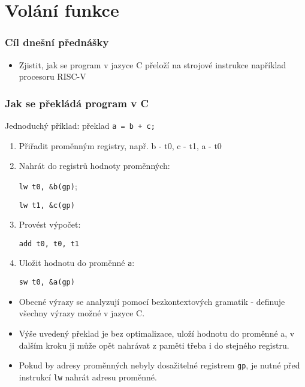 \documentclass{beamer}
\subtitle{Lekce 10. Překlad jazyka C}
\author{Pavel Píša \phantom{xxxxxxxxx} Petr Štěpán \\ \small\texttt{pisa@fel.cvut.cz}\phantom{xxxx}\small\texttt{stepan@fel.cvut.cz}}
\begin{document}
\maketitle

\section{Volání funkce}

\begin{frame}
\frametitle{Cíl dnešní přednášky}

\begin{itemize}
 \item Zjistit, jak se program v jazyce C přeloží na strojové instrukce například procesoru RISC-V
\end{itemize}
\end{frame}


\begin{frame}
\frametitle{Jak se překládá program v C}

Jednoduchý příklad: překlad \texttt{a = b + c;}
\begin{enumerate}
 \item Přiřadit proměnným registry, např. b - t0, c - t1, a - t0
 \item Nahrát do registrů hodnoty proměnných: 
 
 \texttt{lw t0, \&b(gp)}; 
 
 \texttt{lw t1, \&c(gp)}
 \item Provést výpočet: 
 
 \texttt{add t0, t0, t1}
 \item Uložit hodnotu do proměnné \texttt{a}: 
 
 \texttt{sw t0, \&a(gp)} 
\end{enumerate}

\bigskip

\begin{itemize}
 \item Obecné výrazy se analyzují pomocí bezkontextových gramatik - definuje všechny výrazy možné v jazyce C.
 \item Výše uvedený překlad je bez optimalizace, uloží hodnotu do proměnné a, v dalším kroku ji může opět nahrávat z paměti třeba i do stejného registru. 
 \item Pokud by adresy proměnných nebyly dosažitelné registrem \texttt{gp}, je nutné před instrukcí \texttt{lw} nahrát adresu proměnné.
\end{itemize}

\end{frame}
\end{document}
